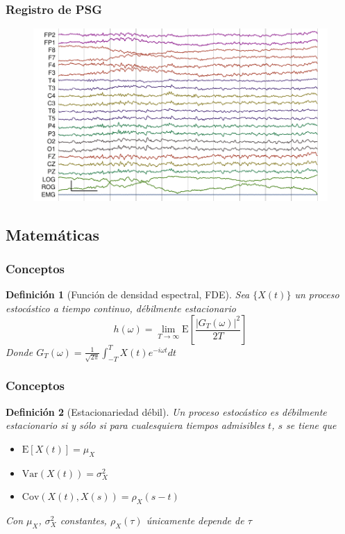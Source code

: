 \documentclass[serif,mathserif,professionalfont]{beamer}
\newtheorem{definicion}{Definición}
\newcommand{\E}[1]{\mathrm{E}\left[ #1 \right]}
\newcommand{\Var}[1]{\mathrm{Var}\left( #1 \right)}
\newcommand{\Cov}[1]{\mathrm{Cov}\left( #1 \right)}
\begin{document}
\begin{frame}\frametitle{Registro de PSG}
\begin{figure}
\centering
\includegraphics[width=0.9\linewidth]{./img_ejemplos/MJNN_epoca_stam.pdf}
\end{figure}
\end{frame}


\subsection{Matem\'aticas}


\begin{frame}\frametitle{Conceptos}

\begin{definicion}[Funci\'on de densidad espectral, FDE]
Sea $\{X(t)\}$ un proceso estoc\'astico a tiempo continuo, d\'ebilmente estacionario
\begin{equation*}
h(\omega) = \lim_{T\rightarrow \infty} \E{ \frac{ \left| G_T(\omega) \right|^{2}}{2 T} }
\end{equation*}
Donde $\displaystyle G_T (\omega) = \frac{1}{\sqrt{2 \pi}} \int_{-T}^{T} X(t) e^{-i \omega t} dt$
\end{definicion}
\end{frame}

\begin{frame}\frametitle{Conceptos}
\begin{definicion}[Estacionariedad d\'ebil]
Un proceso estoc\'astico es d\'ebilmente estacionario si y s\'olo si para cualesquiera tiempos 
admisibles $t$, $s$ se tiene que
\begin{itemize}
\item $\E{X(t)} = \mu_X$
\item $\Var{X(t)} = \sigma^{2}_X$
\item $\Cov{X(t),X(s)} = \rho_X (s-t)$
\end{itemize}
Con $\mu_X$, $\sigma^{2}_X$ constantes, $\rho_X(\tau)$ \'unicamente depende de $\tau$
\end{definicion}
\end{frame}
\end{document}

